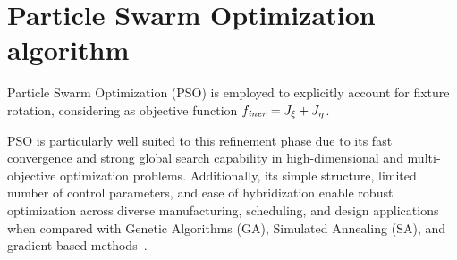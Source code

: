 %
%
%
%
%


\section{Particle Swarm Optimization algorithm}
\label{sec:pso_algorithm}
Particle Swarm Optimization (PSO) is employed to explicitly account for fixture rotation, considering as objective function $f_\mathit{iner} = J_\xi + J_\eta$.

PSO is particularly well suited to this refinement phase due to its fast convergence and strong global search capability in high-dimensional and multi-objective optimization problems. Additionally, its simple structure, limited number of control parameters, and ease of hybridization enable robust optimization across diverse manufacturing, scheduling, and design applications when compared with Genetic Algorithms (GA), Simulated Annealing (SA), and gradient-based methods~\cite{kulkarni2015particle}.

